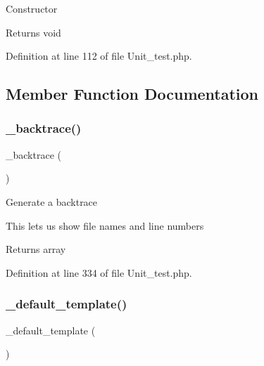 Constructor

\begin{DoxyReturn}{Returns}
void 
\end{DoxyReturn}


Definition at line 112 of file Unit\+\_\+test.\+php.



\subsection{Member Function Documentation}
\mbox{\label{class_c_i___unit__test_aae40ff64c7daf1d70efaf110181a257e}} 
\subsubsection{\texorpdfstring{\_backtrace()}{\_backtrace()}}
{\footnotesize\ttfamily \+\_\+backtrace (\begin{DoxyParamCaption}{ }\end{DoxyParamCaption})\hspace{0.3cm}{\ttfamily [protected]}}

Generate a backtrace

This lets us show file names and line numbers

\begin{DoxyReturn}{Returns}
array 
\end{DoxyReturn}


Definition at line 334 of file Unit\+\_\+test.\+php.

\mbox{\label{class_c_i___unit__test_ae1990fcb9ffc455614eeac9a1091f0b0}} 
\subsubsection{\texorpdfstring{\_default\_template()}{\_default\_template()}}
{\footnotesize\ttfamily \+\_\+default\+\_\+template (\begin{DoxyParamCaption}{ }\end{DoxyParamCaption})\hspace{0.3cm}{\ttfamily [protected]}}

